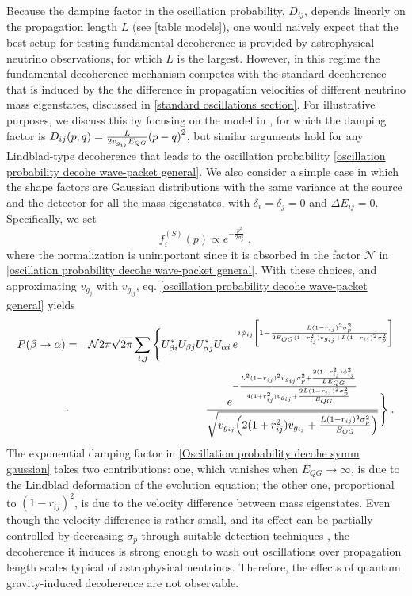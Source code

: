 \documentclass[11pt]{article}
\begin{document}
Because the damping factor in the oscillation probability, $D_{ij}$, depends linearly on the propagation length $L$ (see \cref{table models}), one would naively expect that the best setup for testing fundamental decoherence is provided by astrophysical neutrino observations, for which $L$ is the largest.
However, in this regime the fundamental decoherence mechanism competes with the standard decoherence that is induced by the the difference in propagation velocities of different neutrino mass eigenstates, discussed in \cref{standard oscillations section}. For illustrative purposes, we discuss this by focusing on the model in \cite{Arzano:2022nlo}, for which the damping factor is $D_{ij}(p,q)= \frac{L}{2v_{g_{ij}}E_{QG}}\qty(p-q)^2$, but similar arguments hold for any Lindblad-type decoherence that leads to the oscillation probability \eqref{oscillation probability decohe wave-packet general}. We also consider a simple case in which the shape factors are Gaussian distributions with the same variance at the source and the detector for all the mass eigenstates, with $\delta_i=\delta_j=0$ and $\Delta E_{ij} = 0$. Specifically, we set
\begin{equation}\label{shape factors}
    f_i^{(S)}(p) \propto e^{-\frac{p^2}{2\sigma_p^2}}\;,
\end{equation}
where the normalization is unimportant since it is absorbed in the factor $\mathcal{N}$ in \eqref{oscillation probability decohe wave-packet general}. With these choices, and approximating $v_{g_j}$ with $v_{g_{ij}}$, eq. \eqref{oscillation probability decohe wave-packet general} yields
\begin{eqnarray}
    P(\beta\to\alpha) &=& \mathcal{N} 2\pi\sqrt{2\pi}\sum_{i,j} \Bigg\{U^*_{\beta i} U_{\beta j} U^*_{\alpha j} U_{\alpha i} \, e^{i \phi_{ij}\qty[1-\frac{L(1-r_{ij})^2\sigma_p^2}{2E_{QG}(1+r_{ij}^2)v_{g_{ij}}+L(1-r_{ij})^2\sigma_p^2}]}\nonumber \\ &\cdot&\frac{e^{-\frac{L^2(1-r_{ij})^2v_{g_{ij}}\sigma_p^2+\frac{2(1+r_{ij}^2)\phi_{ij}^2}{LE_{QG}}}{4(1+r_{ij}^2)v_{g_{ij}}+\frac{2L(1-r_{ij})^2\sigma_p^2}{E_{QG}}}}}{\sqrt{v_{g_{ij}}\qty(2(1+r_{ij}^2)v_{g_{ij}}+\frac{L(1-r_{ij})^2\sigma_p^2}{E_{QG}})}}\Bigg\}\;.\label{Oscillation probability decohe symm gaussian}
\end{eqnarray}
The exponential damping factor in  \eqref{Oscillation probability decohe symm gaussian} takes two contributions: one, which vanishes when  $E_{QG}\to \infty$, is due to the Lindblad deformation of the evolution equation; the other one, proportional to $(1-r_{ij})^2$, is due to  the velocity difference between mass eigenstates. Even though the velocity difference is rather small, and its effect can be partially controlled by decreasing $\sigma_p$ through suitable detection techniques \cite{Giunti:1997wq}, the decoherence it induces is strong enough to wash out oscillations over propagation length scales typical of astrophysical neutrinos. Therefore, the effects of quantum gravity-induced decoherence are not observable.
\end{document}
